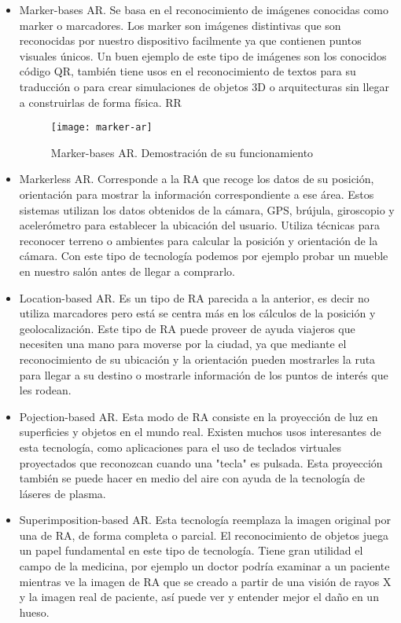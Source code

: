 \begin{itemize}
	\item 
	Marker-bases AR. Se basa en el reconocimiento de imágenes conocidas como marker o marcadores. Los marker son imágenes distintivas que son reconocidas por nuestro dispositivo facilmente ya que contienen puntos visuales únicos. Un buen ejemplo de este tipo de imágenes son los conocidos código QR\cite{URL::CodigoQR}, también tiene usos en el reconocimiento de textos para su traducción o para crear simulaciones de objetos 3D o arquitecturas sin llegar a construirlas de forma física. RR

	\begin{figure}[h]
		\centering
		\texttt{[image: marker-ar]}
		\caption{Marker-bases AR. Demostración de su funcionamiento}
		\label{fig:markerAR}
	\end{figure}

	\item Markerless AR. Corresponde a la RA que recoge los datos de su posición, orientación  para mostrar la información correspondiente a ese área. Estos sistemas utilizan los datos obtenidos de la cámara, GPS, brújula, giroscopio y acelerómetro para establecer la ubicación del usuario. Utiliza técnicas para reconocer terreno o ambientes para calcular la posición y orientación de la cámara. Con este tipo de tecnología podemos por ejemplo probar un mueble en nuestro salón antes de llegar a comprarlo.
	
	\item Location-based AR. Es un tipo de RA parecida a la anterior, es decir no utiliza marcadores pero está se centra más en los cálculos de la posición y geolocalización. Este tipo de RA puede proveer de ayuda viajeros que necesiten una mano para moverse por la ciudad, ya que mediante el reconocimiento de su ubicación y la orientación pueden mostrarles la ruta para llegar a su destino o mostrarle información de los puntos de interés que les rodean. 
 
	\item Pojection-based AR. Esta modo de RA consiste en la proyección de luz en superficies y objetos en el mundo real. Existen muchos usos interesantes de esta tecnología, como aplicaciones para el uso de teclados virtuales proyectados que reconozcan cuando una "tecla" es pulsada. Esta proyección también se puede hacer en medio del aire con ayuda de la tecnología de láseres de plasma.


	\item Superimposition-based AR. Esta tecnología reemplaza la imagen original por una de RA, de forma completa o parcial. El reconocimiento de objetos juega un papel fundamental en este tipo de tecnología. Tiene gran utilidad el campo de la medicina, por ejemplo un doctor podría examinar a un paciente mientras ve la imagen de RA que se creado a partir de una visión de rayos X y la imagen real de paciente, así puede ver y entender mejor el daño en un hueso.
\end{itemize} 



